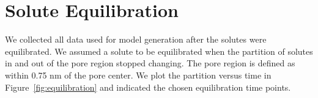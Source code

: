 \documentclass{article}
\begin{document}
  \newpage
  
  \section{Solute Equilibration}\label{section:equilibration}
  
  We collected all data used for model generation after the solutes were 
  equilibrated. We assumed a solute to be equilibrated when the partition of
  solutes in and out of the pore region stopped changing. The pore region is
  defined as within 0.75 nm of the pore center. We plot the partition
  versus time in Figure~\ref{fig:equilibration} and indicated the chosen
  equilibration time points. 
  
  
\end{document}

